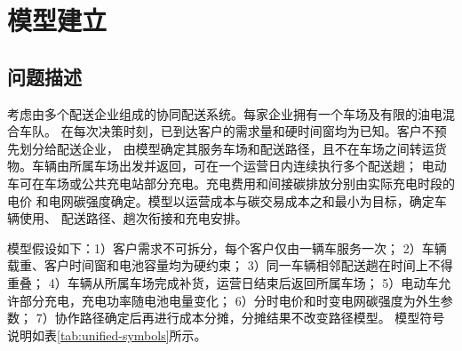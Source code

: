 \documentclass{setp-new}
\begin{document}
\section{模型建立}

\subsection{问题描述}

考虑由多个配送企业组成的协同配送系统。每家企业拥有一个车场及有限的油电混合车队。
在每次决策时刻，已到达客户的需求量和硬时间窗均为已知。客户不预先划分给配送企业，
由模型确定其服务车场和配送路径，且不在车场之间转运货物。车辆由所属车场出发并返回，可在一个运营日内连续执行多个配送趟；
电动车可在车场或公共充电站部分充电。充电费用和间接碳排放分别由实际充电时段的电价
和电网碳强度确定。模型以运营成本与碳交易成本之和最小为目标，确定车辆使用、
配送路径、趟次衔接和充电安排。

模型假设如下：1）客户需求不可拆分，每个客户仅由一辆车服务一次；
2）车辆载重、客户时间窗和电池容量均为硬约束；
3）同一车辆相邻配送趟在时间上不得重叠；
4）车辆从所属车场完成补货，运营日结束后返回所属车场；
5）电动车允许部分充电，充电功率随电池电量变化；
6）分时电价和时变电网碳强度为外生参数；
7）协作路径确定后再进行成本分摊，分摊结果不改变路径模型。
模型符号说明如表\ref{tab:unified-symbols}所示。
\end{document}

